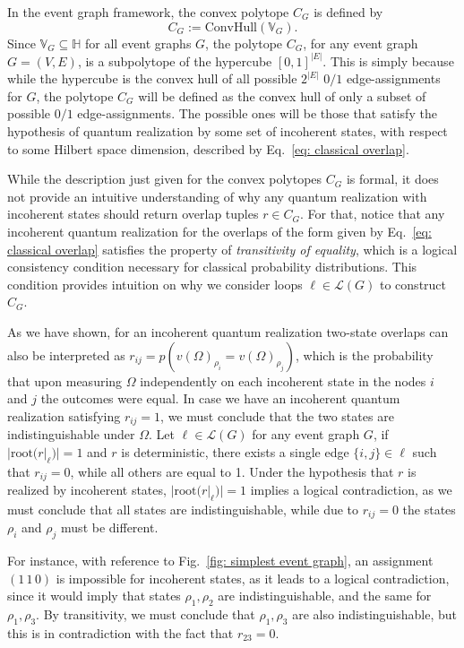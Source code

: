 \documentclass[letterpaper,onecolumn,12pt,accepted=2024-01-17]{article}
\begin{document}
{\begin{equation*}
\end{equation*}
In the event graph framework, the convex polytope $C_G$ is defined by 
\begin{equation}
    C_G := \text{ConvHull}(\mathbb{V}_G).
\end{equation}
Since $\mathbb{V}_G \subseteq \mathbb{H}$ for all event graphs $G$, the polytope $C_G$, for any event graph $G = (V,E)$, is a subpolytope of the hypercube $[0,1]^{|E|}$. This is simply because while the hypercube is the convex hull of all possible $2^{|E|}$ $0/1$ edge-assignments for $G$, the polytope $C_G$ will be defined as the convex hull of only a subset of possible $0/1$ edge-assignments. The possible ones will be those that satisfy the hypothesis of quantum realization by some set of incoherent states, with respect to some Hilbert space dimension, described by Eq.~\eqref{eq: classical overlap}.
}

{
While the description just given for the convex polytopes $C_G$ is formal, it does not provide an intuitive understanding of why any quantum realization with incoherent states should return overlap tuples $r \in C_G$. For that, notice that any incoherent quantum realization for the overlaps of the form given by Eq.~\eqref{eq: classical overlap} satisfies the property of \textit{transitivity of equality}, which is a logical consistency condition necessary for classical probability distributions. This condition provides intuition on why we consider loops $\ell \in \mathcal{L}(G)$ to construct $C_G$. 

As we have shown, for an incoherent quantum realization two-state overlaps can also be interpreted as $r_{ij} = p(v(\Omega)_{\rho_i} = v(\Omega)_{\rho_j})$, which is the probability that upon measuring $\Omega$ independently on each incoherent state in the nodes $i$ and $j$ the outcomes were equal. In case we have an incoherent quantum realization satisfying $r_{ij}=1$, we must conclude that the two states are indistinguishable under $\Omega$. Let $\ell \in \mathcal{L}(G)$ for any event graph $G$, if $|\text{root}(r|_{\ell})| = 1$ and $r$ is deterministic, there exists a single edge $\{i,j\} \in \ell$ such that $r_{ij}=0$, while all others are equal to 1. Under the hypothesis that $r$ is realized by incoherent states, $|\text{root}(r|_{\ell})| = 1$ implies a logical contradiction, as we must conclude that all states are indistinguishable, while due to $r_{ij}=0$ the states $\rho_i$ and $\rho_j$ must be different.  
} For instance, with reference to Fig.~\ref{fig: simplest event graph}, an assignment $(1\,1\,0)$ is impossible for incoherent states, as it leads to a logical contradiction{, since it would imply that states $\rho_1,\rho_2$ are indistinguishable, and the same for  $\rho_1,\rho_3$. By transitivity, we must conclude that $\rho_1,\rho_3$ are also indistinguishable, but this is in contradiction with the fact that $r_{23}=0$}.
\end{document}
